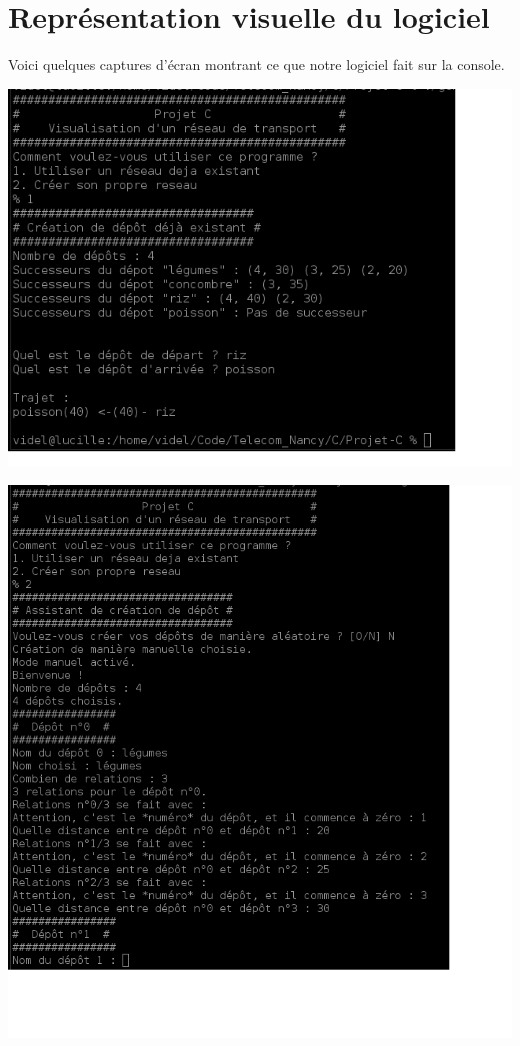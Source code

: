 \documentclass[12pt,a4paper]{report}
\begin{document}
\section{Représentation visuelle du logiciel}
Voici quelques captures d'écran montrant ce que notre logiciel fait sur la console. 
\begin{center}
\includegraphics[scale=0.5]{capture4.png}
\label{fig6}
\end{center}
\begin{center}
\includegraphics[scale=0.5]{capture5.png}
\label{fig7}
\end{center}
\end{document}
